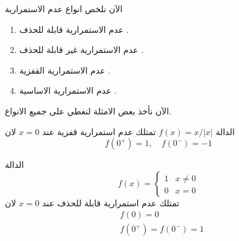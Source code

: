 \noindent
الآن نلخص انواع عدم الاستمرارية
\begin{enumerate}
	\item عدم الاستمرارية قابلة للحذف .
\item عدم الاستمرارية غير قابلة للحذف .
\item عدم الاستمرارية القفزية .
\item عدم الاستمرارية الاساسية .
\end{enumerate}
الآن نأخذ بعض الامثلة لنغطي على جميع الانواع.
\newpage
\begin{example}
	الدالة $f(x) = x/|x|$ تمتلك عدم استمرارية قفزية عند $x=0$ لان 
	\[
	f(0^+) = 1,\quad f(0^-) = -1
	\]
	
	\begin{figure}[H]
		\centering
		\caption{}
	\end{figure}
\end{example}

\begin{example}
	الدالة
	\[
	f(x) =
	\begin{cases}
		1 & x\neq0 \\
		0 & x=0
	\end{cases}
	\]
	تمتلك عدم استمرارية قابلة للحذف عند $x=0$ لان 
	\begin{align*}
		& f(0) = 0\\
		& f(0^+) = f(0^-) = 1
	\end{align*}
\end{example}


